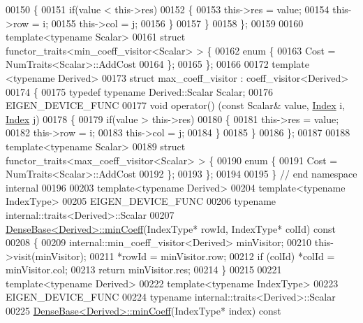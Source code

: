 \begin{DoxyCode}
00150   \{
00151     \textcolor{keywordflow}{if}(value < this->res)
00152     \{
00153       this->res = value;
00154       this->row = i;
00155       this->col = j;
00156     \}
00157   \}
00158 \};
00159 
00160 \textcolor{keyword}{template}<\textcolor{keyword}{typename} Scalar>
00161 \textcolor{keyword}{struct }functor\_traits<min\_coeff\_visitor<Scalar> > \{
00162   \textcolor{keyword}{enum} \{
00163     Cost = NumTraits<Scalar>::AddCost
00164   \};
00165 \};
00166 
00172 \textcolor{keyword}{template} <\textcolor{keyword}{typename} Derived>
00173 \textcolor{keyword}{struct }max\_coeff\_visitor : coeff\_visitor<Derived>
00174 \{
00175   \textcolor{keyword}{typedef} \textcolor{keyword}{typename} Derived::Scalar Scalar; 
00176   EIGEN\_DEVICE\_FUNC
00177   \textcolor{keywordtype}{void} operator() (\textcolor{keyword}{const} Scalar& value, \hyperlink{namespace_eigen_a62e77e0933482dafde8fe197d9a2cfde}{Index} i, \hyperlink{namespace_eigen_a62e77e0933482dafde8fe197d9a2cfde}{Index} j)
00178   \{
00179     \textcolor{keywordflow}{if}(value > this->res)
00180     \{
00181       this->res = value;
00182       this->row = i;
00183       this->col = j;
00184     \}
00185   \}
00186 \};
00187 
00188 \textcolor{keyword}{template}<\textcolor{keyword}{typename} Scalar>
00189 \textcolor{keyword}{struct }functor\_traits<max\_coeff\_visitor<Scalar> > \{
00190   \textcolor{keyword}{enum} \{
00191     Cost = NumTraits<Scalar>::AddCost
00192   \};
00193 \};
00194 
00195 \} \textcolor{comment}{// end namespace internal}
00196 
00203 \textcolor{keyword}{template}<\textcolor{keyword}{typename} Derived>
00204 \textcolor{keyword}{template}<\textcolor{keyword}{typename} IndexType>
00205 EIGEN\_DEVICE\_FUNC
00206 \textcolor{keyword}{typename} internal::traits<Derived>::Scalar
00207 \hyperlink{group___core___module_a6634944be3d4fef551b57ffad30467f2}{DenseBase<Derived>::minCoeff}(IndexType* rowId, IndexType* colId)\textcolor{keyword}{ const}
00208 \textcolor{keyword}{}\{
00209   internal::min\_coeff\_visitor<Derived> minVisitor;
00210   this->visit(minVisitor);
00211   *rowId = minVisitor.row;
00212   \textcolor{keywordflow}{if} (colId) *colId = minVisitor.col;
00213   \textcolor{keywordflow}{return} minVisitor.res;
00214 \}
00215 
00221 \textcolor{keyword}{template}<\textcolor{keyword}{typename} Derived>
00222 \textcolor{keyword}{template}<\textcolor{keyword}{typename} IndexType>
00223 EIGEN\_DEVICE\_FUNC
00224 \textcolor{keyword}{typename} internal::traits<Derived>::Scalar
00225 \hyperlink{group___core___module_a6634944be3d4fef551b57ffad30467f2}{DenseBase<Derived>::minCoeff}(IndexType* index)\textcolor{keyword}{ const}

\end{DoxyCode}
